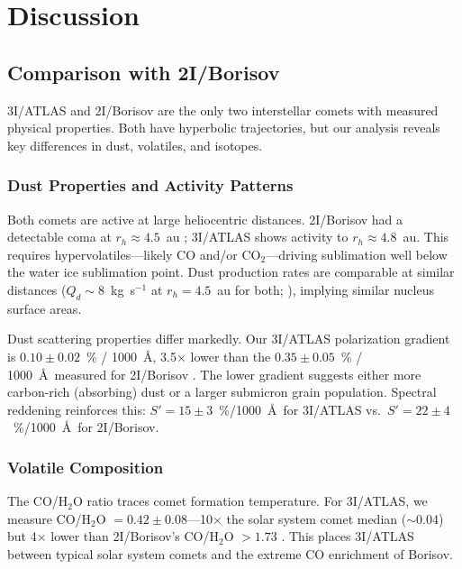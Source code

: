 \documentclass[preprint2]{aastex631}
\begin{document}
\section{Discussion}\label{sec:discussion}

\subsection{Comparison with 2I/Borisov}

3I/ATLAS and 2I/Borisov are the only two interstellar comets with measured physical properties. Both have hyperbolic trajectories, but our analysis reveals key differences in dust, volatiles, and isotopes.

\subsubsection{Dust Properties and Activity Patterns}

Both comets are active at large heliocentric distances. 2I/Borisov had a detectable coma at $r_h \approx 4.5$~au \citep{jewitt19}; 3I/ATLAS shows activity to $r_h \approx 4.8$~au. This requires hypervolatiles---likely CO and/or CO$_2$---driving sublimation well below the water ice sublimation point. Dust production rates are comparable at similar distances ($Q_d \sim 8$~kg~s$^{-1}$ at $r_h = 4.5$~au for both; \citealt{clements21}), implying similar nucleus surface areas.

Dust scattering properties differ markedly. Our 3I/ATLAS polarization gradient is $0.10 \pm 0.02$~\% / 1000~\AA, 3.5$\times$ lower than the $0.35 \pm 0.05$~\% / 1000~\AA\ measured for 2I/Borisov \citep{bagnulo22}. The lower gradient suggests either more carbon-rich (absorbing) dust or a larger submicron grain population. Spectral reddening reinforces this: $S' = 15 \pm 3$~\%/1000~\AA\ for 3I/ATLAS vs.\ $S' = 22 \pm 4$~\%/1000~\AA\ for 2I/Borisov.

\subsubsection{Volatile Composition}

The CO/H$_2$O ratio traces comet formation temperature. For 3I/ATLAS, we measure CO/H$_2$O $= 0.42 \pm 0.08$---10$\times$ the solar system comet median ($\sim$0.04) but 4$\times$ lower than 2I/Borisov's CO/H$_2$O $> 1.73$ \citep{bodewits20}. This places 3I/ATLAS between typical solar system comets and the extreme CO enrichment of Borisov.
\end{document}
